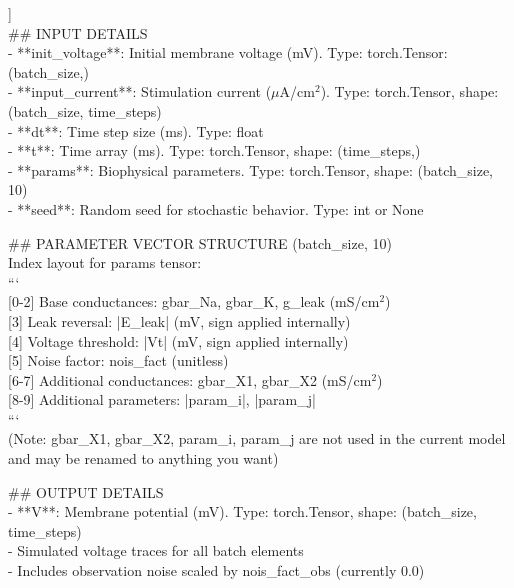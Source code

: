 \begin{tcolorbox}[
  breakable, enhanced,
  title={User},
  colback=UserBg, colframe=UserFrame,
  coltitle=white, fonttitle=\bfseries\small,
  arc=2mm, boxrule=1pt,
  before upper={\small\setlength{\parindent}{0pt}\setlength{\parskip}{2pt}},
]
\par\noindent [[ \#\# signature\_description \#\# ]]\\
\noindent
\#\# INPUT DETAILS\\{}
- **init\_voltage**: Initial membrane voltage (mV). Type: torch.Tensor: (batch\_size,)\\{}
- **input\_current**: Stimulation current ($\mu$A/cm$^{2}$). Type: torch.Tensor, shape: (batch\_size, time\_steps)\\{}
- **dt**: Time step size (ms). Type: float\\{}
- **t**: Time array (ms). Type: torch.Tensor, shape: (time\_steps,)\\{}
- **params**: Biophysical parameters. Type: torch.Tensor, shape: (batch\_size, 10)\\{}
- **seed**: Random seed for stochastic behavior. Type: int or None
\par\smallskip
\#\# PARAMETER VECTOR STRUCTURE (batch\_size, 10)\\{}
Index layout for params tensor:\\{}
```\\{}
[0-2]   Base conductances: gbar\_Na, gbar\_K, g\_leak (mS/cm$^{2}$)\\{}
[3]     Leak reversal: |E\_leak| (mV, sign applied internally)\\{}
[4]     Voltage threshold: |Vt| (mV, sign applied internally)\\{}
[5]     Noise factor: nois\_fact (unitless)\\{}
[6-7]   Additional conductances: gbar\_X1, gbar\_X2 (mS/cm$^{2}$)\\{}
[8-9]   Additional parameters: |param\_i|, |param\_j|\\{}
```\\{}
(Note: gbar\_X1, gbar\_X2, param\_i, param\_j are not used in the current model and may be renamed to anything you want)
\par\smallskip
\#\# OUTPUT DETAILS\\{}
- **V**: Membrane potential (mV). Type: torch.Tensor, shape: (batch\_size, time\_steps)\\{}
  - Simulated voltage traces for all batch elements\\{}
  - Includes observation noise scaled by nois\_fact\_obs (currently 0.0)

\end{tcolorbox}
